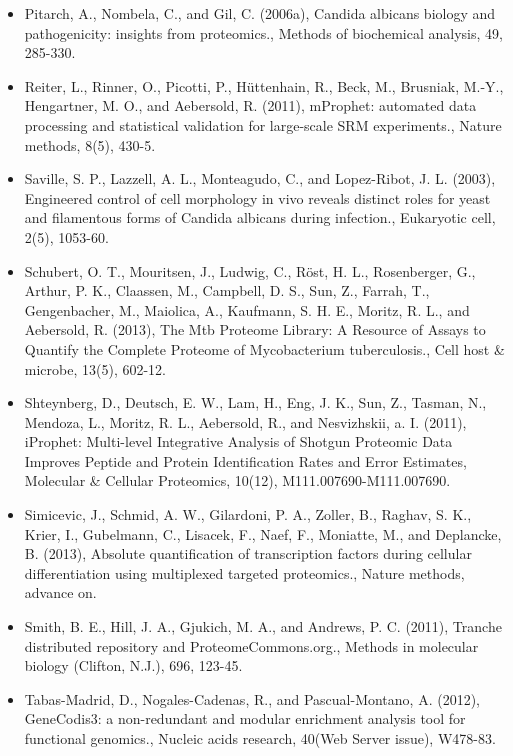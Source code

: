 \begin{itemize}
\item[]{
Pitarch, A., Nombela, C., and Gil, C. (2006a), Candida albicans biology and pathogenicity:
insights from proteomics., Methods of biochemical analysis, 49, 285-330.
}

\item[]{
Reiter, L., Rinner, O., Picotti, P., Hüttenhain, R., Beck, M., Brusniak, M.-Y., Hengartner, M. O.,
and Aebersold, R. (2011), mProphet: automated data processing and statistical validation
for large-scale SRM experiments., Nature methods, 8(5), 430-5.
}

\item[]{
Saville, S. P., Lazzell, A. L., Monteagudo, C., and Lopez-Ribot, J. L. (2003), Engineered control
of cell morphology in vivo reveals distinct roles for yeast and filamentous forms of Candida
albicans during infection., Eukaryotic cell, 2(5), 1053-60.
}

\item[]{
Schubert, O. T., Mouritsen, J., Ludwig, C., Röst, H. L., Rosenberger, G., Arthur, P. K., Claassen,
M., Campbell, D. S., Sun, Z., Farrah, T., Gengenbacher, M., Maiolica, A., Kaufmann, S. H. E.,
Moritz, R. L., and Aebersold, R. (2013), The Mtb Proteome Library: A Resource of Assays
to Quantify the Complete Proteome of Mycobacterium tuberculosis., Cell host \& microbe,
13(5), 602-12.
}

\item[]{
Shteynberg, D., Deutsch, E. W., Lam, H., Eng, J. K., Sun, Z., Tasman, N., Mendoza, L., Moritz,
R. L., Aebersold, R., and Nesvizhskii, a. I. (2011), iProphet: Multi-level Integrative Analysis
of Shotgun Proteomic Data Improves Peptide and Protein Identification Rates and Error
Estimates, Molecular \& Cellular Proteomics, 10(12), M111.007690-M111.007690.
}

\item[]{
Simicevic, J., Schmid, A. W., Gilardoni, P. A., Zoller, B., Raghav, S. K., Krier, I., Gubelmann,
C., Lisacek, F., Naef, F., Moniatte, M., and Deplancke, B. (2013), Absolute quantification
of transcription factors during cellular differentiation using multiplexed targeted proteomics.,
Nature methods, advance on.
}

\item[]{
Smith, B. E., Hill, J. A., Gjukich, M. A., and Andrews, P. C. (2011), Tranche 
distributed repository and ProteomeCommons.org., Methods in molecular biology (Clifton, N.J.), 696,
123-45.
}

\item[]{
Tabas-Madrid, D., Nogales-Cadenas, R., and Pascual-Montano, A. (2012), GeneCodis3: a
non-redundant and modular enrichment analysis tool for functional genomics., Nucleic acids
research, 40(Web Server issue), W478-83.
}


\end{itemize}
